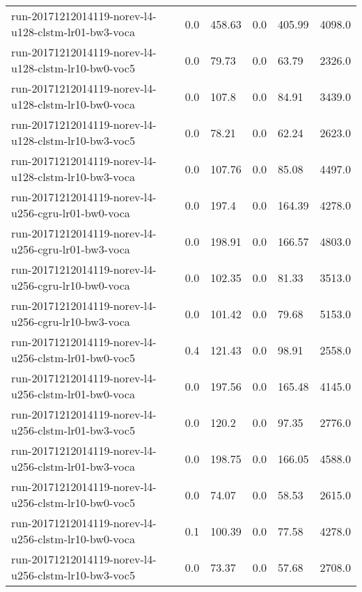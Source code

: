 \begin{landscape}
\begin{longtable}{p{.47\textheight} p{.08\textheight} p{.08\textheight} p{.08\textheight} p{.08\textheight} p{.08\textheight}}
    run-20171212014119-norev-l4-u128-clstm-lr01-bw3-voca & \num{0.0} & \num{458.63} & \num{0.0} & \num{405.99} & \num{4098.0}\\
    run-20171212014119-norev-l4-u128-clstm-lr10-bw0-voc5 & \num{0.0} & \num{79.73} & \num{0.0} & \num{63.79} & \num{2326.0}\\
    run-20171212014119-norev-l4-u128-clstm-lr10-bw0-voca & \num{0.0} & \num{107.8} & \num{0.0} & \num{84.91} & \num{3439.0}\\
    run-20171212014119-norev-l4-u128-clstm-lr10-bw3-voc5 & \num{0.0} & \num{78.21} & \num{0.0} & \num{62.24} & \num{2623.0}\\
    run-20171212014119-norev-l4-u128-clstm-lr10-bw3-voca & \num{0.0} & \num{107.76} & \num{0.0} & \num{85.08} & \num{4497.0}\\
    run-20171212014119-norev-l4-u256-cgru-lr01-bw0-voca & \num{0.0} & \num{197.4} & \num{0.0} & \num{164.39} & \num{4278.0}\\
    run-20171212014119-norev-l4-u256-cgru-lr01-bw3-voca & \num{0.0} & \num{198.91} & \num{0.0} & \num{166.57} & \num{4803.0}\\
    run-20171212014119-norev-l4-u256-cgru-lr10-bw0-voca & \num{0.0} & \num{102.35} & \num{0.0} & \num{81.33} & \num{3513.0}\\
    run-20171212014119-norev-l4-u256-cgru-lr10-bw3-voca & \num{0.0} & \num{101.42} & \num{0.0} & \num{79.68} & \num{5153.0}\\
    run-20171212014119-norev-l4-u256-clstm-lr01-bw0-voc5 & \num{0.4} & \num{121.43} & \num{0.0} & \num{98.91} & \num{2558.0}\\
    run-20171212014119-norev-l4-u256-clstm-lr01-bw0-voca & \num{0.0} & \num{197.56} & \num{0.0} & \num{165.48} & \num{4145.0}\\
    run-20171212014119-norev-l4-u256-clstm-lr01-bw3-voc5 & \num{0.0} & \num{120.2} & \num{0.0} & \num{97.35} & \num{2776.0}\\
    run-20171212014119-norev-l4-u256-clstm-lr01-bw3-voca & \num{0.0} & \num{198.75} & \num{0.0} & \num{166.05} & \num{4588.0}\\
    run-20171212014119-norev-l4-u256-clstm-lr10-bw0-voc5 & \num{0.0} & \num{74.07} & \num{0.0} & \num{58.53} & \num{2615.0}\\
    run-20171212014119-norev-l4-u256-clstm-lr10-bw0-voca & \num{0.1} & \num{100.39} & \num{0.0} & \num{77.58} & \num{4278.0}\\
    run-20171212014119-norev-l4-u256-clstm-lr10-bw3-voc5 & \num{0.0} & \num{73.37} & \num{0.0} & \num{57.68} & \num{2708.0}\\

\end{longtable}
\end{landscape}
